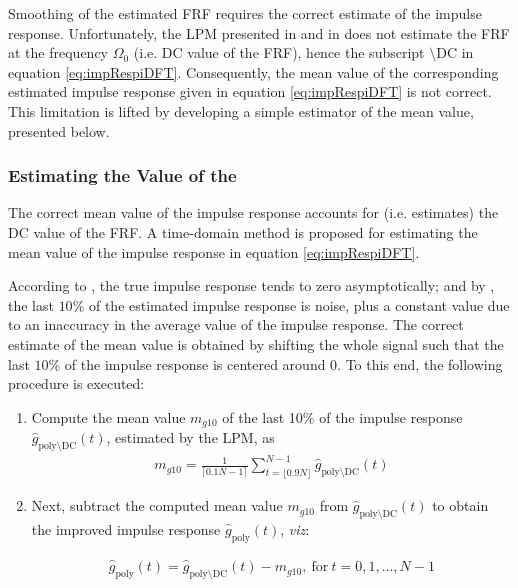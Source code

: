 Smoothing of the estimated \gls{FRF} requires the correct estimate of the impulse response. Unfortunately, the \gls{LPM} presented in  and in \citep{Schoukens2009LPM} does not estimate the \gls{FRF}  at the frequency $\Omega_0$ (i.e. \gls{DC} value of the \gls{FRF}), hence the subscript $\setminus\mathrm{DC}$ in equation \eqref{eq:impRespiDFT}. Consequently, the mean value of the corresponding estimated impulse response given in equation \eqref{eq:impRespiDFT} is not correct. 
This limitation is lifted by developing a simple estimator of the mean value, presented below.

\subsubsection{Estimating the  Value of the }\label{se:DCvalueEst}
The correct mean value of the impulse response accounts for (i.e. estimates) the \gls{DC} value of the \gls{FRF}. A time-domain method is proposed for estimating the mean value of the impulse response in equation \eqref{eq:impRespiDFT}. %

According to , the true impulse response tends to zero asymptotically; and by , the last $10\%$ of the estimated impulse response is noise, plus a constant value due to an inaccuracy in the    average value of the impulse response. The correct estimate of the mean value is obtained by shifting the whole signal such that the last $10\%$ of the impulse response is centered around 0.
To this end, the following procedure is executed:


\begin{enumerate}
\item Compute the mean value $m_{g10}$ of the last 10\% of the impulse response $\hat g_{\mathrm{poly}\setminus \mathrm{DC
}}(t)$, estimated by the \gls{LPM}, as %
\begin{align}
m_{g10} = \frac{1}{\lceil0.1N - 1\rceil}\sum_{t=\lfloor0.9N\rfloor}^{N-1}\hat g_{\mathrm{poly}\setminus \mathrm{DC
}}(t)
\end{align}

\item Next, subtract the computed mean value $m_{g10}$ from $\hat g_{\mathrm{poly}\setminus \mathrm{DC
}}(t)$ to obtain the improved impulse response $\hat g_\mathrm{poly}(t)$, \emph{viz}:


\begin{align}
\hat g_\mathrm{poly}(t) = \hat g_{\mathrm{poly}\setminus \mathrm{DC}}(t) - m_{g10},\ \text{for}\ t=0,1,\dots,N-1
\end{align}
\end{enumerate}

